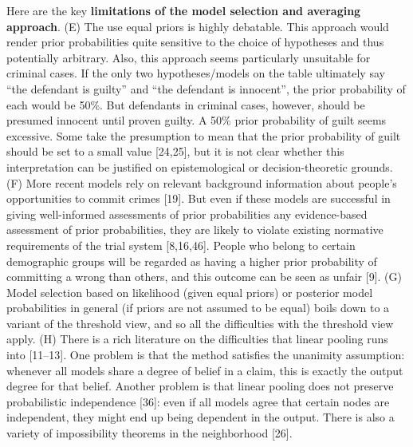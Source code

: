 \documentclass[11pt,dvipsnames,enabledeprecatedfontcommands]{scrartcl}
\begin{document}
Here are the key
\textbf{limitations of the model selection and averaging approach}. (E)
The use equal priors is highly debatable. This approach would render
prior probabilities quite sensitive to the choice of hypotheses and thus
potentially arbitrary. Also, this approach seems particularly unsuitable
for criminal cases. If the only two hypotheses/models on the table
ultimately say ``the defendant is guilty'' and ``the defendant is
innocent'', the prior probability of each would be 50\%. But defendants
in criminal cases, however, should be presumed innocent until proven
guilty. A 50\% prior probability of guilt seems excessive. Some take the
presumption to mean that the prior probability of guilt should be set to
a small value {[}24,25{]}, but it is not clear whether this
interpretation can be justified on epistemological or decision-theoretic
grounds. (F) More recent models rely on relevant background information
about people's opportunities to commit crimes {[}19{]}. But even if
these models are successful in giving well-informed assessments of prior
probabilities any evidence-based assessment of prior probabilities, they
are likely to violate existing normative requirements of the trial
system {[}8,16,46{]}. People who belong to certain demographic groups
will be regarded as having a higher prior probability of committing a
wrong than others, and this outcome can be seen as unfair {[}9{]}. (G)
Model selection based on likelihood (given equal priors) or posterior
model probabilities in general (if priors are not assumed to be equal)
boils down to a variant of the threshold view, and so all the
difficulties with the threshold view apply. (H) There is a rich
literature on the difficulties that linear pooling runs into
{[}11--13{]}. One problem is that the method satisfies the unanimity
assumption: whenever all models share a degree of belief in a claim,
this is exactly the output degree for that belief. Another problem is
that linear pooling does not preserve probabilistic independence
{[}36{]}: even if all models agree that certain nodes are independent,
they might end up being dependent in the output. There is also a variety
of impossibility theorems in the neighborhood {[}26{]}.

\vspace{1mm}
\end{document}
